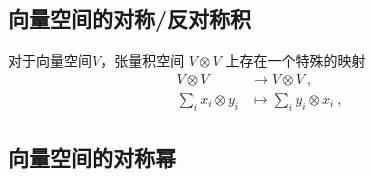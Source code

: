 

\subsection{向量空间的对称/反对称积}

对于向量空间$V$，张量积空间 $V \otimes V$ 上存在一个特殊的映射
\begin{equation}
\begin{aligned}
V \otimes V &\to V \otimes V~, \\
\sum_i x_i \otimes y_i &\mapsto \sum_i y_i \otimes x_i~,
\end{aligned}
\end{equation}



\subsection{向量空间的对称幂}